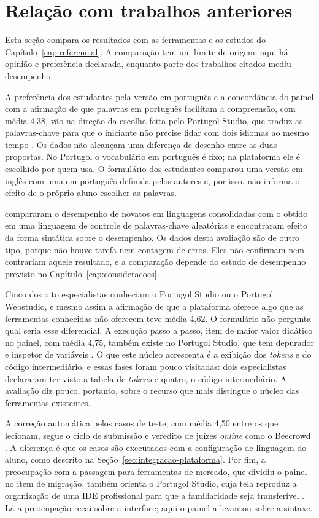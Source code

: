 \section{Relação com trabalhos anteriores}
\label{sec:resultado-literatura}

Esta seção compara os resultados com as ferramentas e os estudos do Capítulo~\ref{cap:referencial}. A comparação tem um limite de origem: aqui há opinião e preferência declarada, enquanto parte dos trabalhos citados mediu desempenho.

A preferência dos estudantes pela versão em português e a concordância do painel com a afirmação de que palavras em português facilitam a compreensão, com média 4,38, vão na direção da escolha feita pelo Portugol Studio, que traduz as palavras-chave para que o iniciante não precise lidar com dois idiomas ao mesmo tempo \cite{univali2026}. Os dados não alcançam uma diferença de desenho entre as duas propostas. No Portugol o vocabulário em português é fixo; na plataforma ele é escolhido por quem usa. O formulário dos estudantes comparou uma versão em inglês com uma em português definida pelos autores e, por isso, não informa o efeito de o próprio aluno escolher as palavras.

 compararam o desempenho de novatos em linguagens consolidadas com o obtido em uma linguagem de controle de palavras-chave aleatórias e encontraram efeito da forma sintática sobre o desempenho. Os dados desta avaliação são de outro tipo, porque não houve tarefa nem contagem de erros. Eles não confirmam nem contrariam aquele resultado, e a comparação depende do estudo de desempenho previsto no Capítulo~\ref{cap:consideracoes}.

Cinco dos oito especialistas conheciam o Portugol Studio ou o Portugol Webstudio, e mesmo assim a afirmação de que a plataforma oferece algo que as ferramentas conhecidas não oferecem teve média 4,62. O formulário não pergunta qual seria esse diferencial. A execução passo a passo, item de maior valor didático no painel, com média 4,75, também existe no Portugol Studio, que tem depurador e inspetor de variáveis \cite{univali2026}. O que este núcleo acrescenta é a exibição dos \textit{tokens} e do código intermediário, e essas fases foram pouco visitadas: dois especialistas declararam ter visto a tabela de \textit{tokens} e quatro, o código intermediário. A avaliação diz pouco, portanto, sobre o recurso que mais distingue o núcleo das ferramentas existentes.

A correção automática pelos casos de teste, com média 4,50 entre os que lecionam, segue o ciclo de submissão e veredito de juízes \textit{online} como o Beecrowd \cite{beecrowd2026faq}. A diferença é que os casos são executados com a configuração de linguagem do aluno, como descrito na Seção~\ref{sec:integracao-plataforma}. Por fim, a preocupação com a passagem para ferramentas de mercado, que dividiu o painel no item de migração, também orienta o Portugol Studio, cuja tela reproduz a organização de uma IDE profissional para que a familiaridade seja transferível \cite{univali2026}. Lá a preocupação recai sobre a interface; aqui o painel a levantou sobre a sintaxe.

